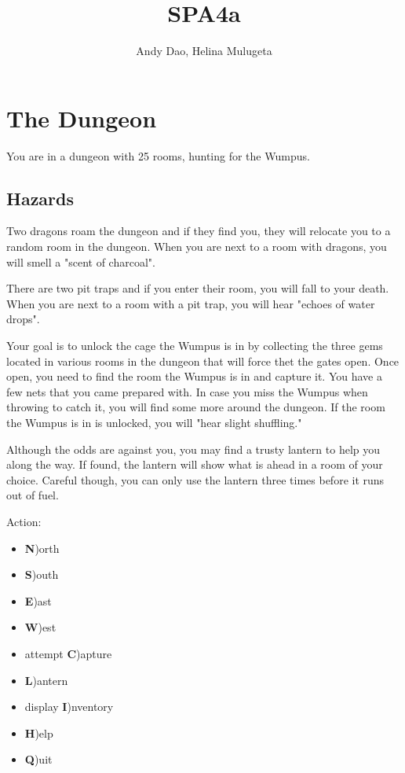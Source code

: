 \documentclass{formalLabReport} %
\title{SPA4a}
\author{Andy Dao, Helina Mulugeta}
\begin{document}
\maketitle

\section{The Dungeon}

You are in a dungeon with 25 rooms, hunting for the Wumpus. 

\subsection{Hazards}
Two dragons roam the dungeon and if they find you, they will relocate you to a random room in the dungeon. When you are next to a room with dragons, you will smell a "scent of charcoal".

There are two pit traps and if you enter their room, you will fall to your death. When you are next to a room with a pit trap, you will hear "echoes of water drops".

Your goal is to unlock the cage the Wumpus is in by collecting the three gems located in various rooms in the dungeon that will force thet the gates open. Once open, you need to find the room the Wumpus is in and capture it. You have a few nets that you came prepared with. In case you miss the Wumpus when throwing to catch it, you will find some more around the dungeon. If the room the Wumpus is in is unlocked, you will  "hear slight shuffling."

Although the odds are against you, you may find a trusty lantern to help you along the way. If found, the lantern will show what is ahead in a room of your choice. Careful though, you can only use the lantern three times before it runs out of fuel.

Action: 
\begin{itemize}
    \item \textbf{N})orth
    \item \textbf{S})outh
    \item \textbf{E})ast
    \item \textbf{W})est
    \item attempt \textbf{C})apture
    \item \textbf{L})antern
    \item display \textbf{I})nventory
    \item \textbf{H})elp
    \item \textbf{Q})uit
\end{itemize}
\end{document}
